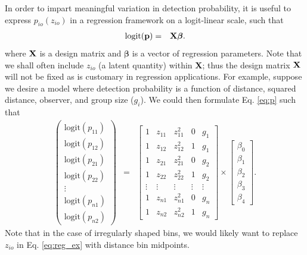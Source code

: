 \documentclass[aoas,preprint]{imsart}
\numberwithin{equation}{section}
\theoremstyle{plain}
\begin{document}
In order to impart meaningful variation in detection probability, it is useful to express $p_{io}(z_{io})$ in a regression framework on a logit-linear scale, such that
\begin{eqnarray}
  \textrm{logit}({\bf p}) & = & {\bf X} \boldsymbol{\beta}.
  \label{eq:p}
\end{eqnarray}
where ${\bf X}$ is a design matrix and $\boldsymbol{\beta}$ is a vector of regression parameters.
Note that we shall often include $z_{io}$ (a latent quantity) within \textbf{X}; thus  the design matrix ${\bf X}$ will not be fixed as is customary in regression applications.  For example, suppose we desire a model where detection probability is a function of distance, squared distance, observer, and group size ($g_i$).  We could then formulate Eq. \ref{eq:p} such that
\begin{eqnarray}
  \left(
  \begin{array}{c}
    \textrm{logit}(p_{11}) \\
    \textrm{logit}(p_{12}) \\
    \textrm{logit}(p_{21}) \\
    \textrm{logit}(p_{22}) \\
    \vdots \\
    \textrm{logit}(p_{n1}) \\
    \textrm{logit}(p_{n2})
  \end{array}
  \right)
    & = &
  \left[
  \begin{array}{ccccc}
    1 & z_{11} & z_{11}^2 & 0 & g_1 \\
    1 & z_{12} & z_{12}^2 & 1 & g_1 \\
    1 & z_{21} & z_{21}^2 & 0 & g_2 \\
    1 & z_{22} & z_{22}^2 & 1 & g_2 \\
    \vdots & \vdots & \vdots & \vdots & \vdots \\
    1 & z_{n1} & z_{n1}^2 & 0 & g_n \\
    1 & z_{n2} & z_{n2}^2 & 1 & g_n
  \end{array}
  \right] \times
      \left[
  \begin{array}{c}
    \beta_0 \\
    \beta_1 \\
    \beta_2 \\
    \beta_3 \\
    \beta_4
  \end{array}
  \right].
  \label{eq:reg_ex}
\end{eqnarray}
Note that in the case of irregularly shaped bins, we would likely want to replace $z_{io}$ in Eq. \ref{eq:reg_ex} with distance bin midpoints.
\end{document}
